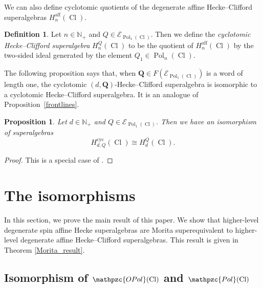 \documentclass[11pt]{amsart}
\newtheorem{prop}[theo]{Proposition}
\theoremstyle{definition}
\newtheorem{defn}[theo]{Definition}
\numberwithin{equation}{section}
\begin{document}
We can also define cyclotomic quotients of the degenerate affine Hecke--Clifford superalgebras $ H_{n}^{\operatorname{aff}}(\operatorname{Cl}) $.

\begin{defn}
Let $ n \in \mathbb{N}_{+} $ and $ Q \in \mathcal{E}_{\operatorname{Pol}_{1}(\operatorname{Cl})} $. Then we define the \emph{cyclotomic Hecke--Clifford superalgebra} $ H_{n}^{Q}(\operatorname{Cl}) $ to be the quotient of $ H_{n}^{\operatorname{aff}}(\operatorname{Cl}) $ by the two-sided ideal generated by the element $ Q_{1} \in \operatorname{Pol}_{n}(\operatorname{Cl}) $.
\end{defn}

The following proposition says that, when $ \mathbf{Q} \in F(\mathcal{E}_{\operatorname{Pol}_{1}(\operatorname{Cl})}) $ is a word of length one, the cyclotomic $ (d,\mathbf{Q}) $-Hecke--Clifford superalgebra is isomorphic to a cyclotomic Hecke--Clifford superalgebra. It is an analogue of Proposition~\ref{frontlines}.

\begin{prop} \label{Cliff_cyclotomic_result}
Let $ d \in \mathbb{N}_{+} $ and $ Q \in \mathcal{E}_{\operatorname{Pol}_{1}(\operatorname{Cl})} $. Then we have an isomorphism of superalgebras
\begin{equation*}
H_{d,Q}^{\operatorname{cyc}}(\operatorname{Cl}) \cong H_{d}^{Q}(\operatorname{Cl}).
\end{equation*}
\end{prop}

\begin{proof}
This is a special case of \cite[Thm.~5.34]{Moran}.
\end{proof}




\section{The isomorphisms} \label{Morita_superequivalence123}

In this section, we prove the main result of this paper. We show that higher-level degenerate spin affine Hecke superalgebras are Morita superequivalent to higher-level degenerate affine Hecke--Clifford superalgebras. This result is given in Theorem \ref{Morita_result}.

\subsection{Isomorphism of $ \mathpzc{OPol}(\operatorname{Cl}) $ and $ \mathpzc{Pol}(\operatorname{Cl}) $} \label{Isomorphism1}
\end{document}

